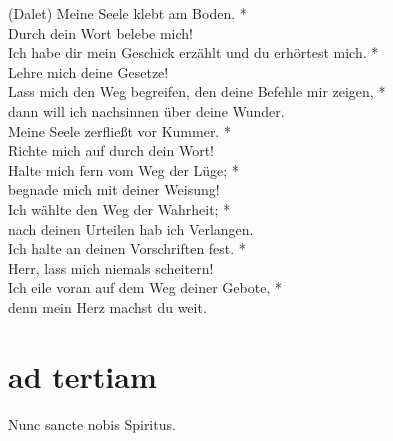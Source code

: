                           (Dalet)
Meine Seele klebt am Boden. *\\
Durch dein Wort belebe mich!\\ \vin 
Ich habe dir mein Geschick erzählt und du erhörtest mich. *\\ \vin
Lehre mich deine Gesetze!\\
Lass mich den Weg begreifen, den deine Befehle mir zeigen, *\\
dann will ich nachsinnen über deine Wunder.\\ \vin
Meine Seele zerfließt vor Kummer. *\\ \vin
Richte mich auf durch dein Wort!\\
Halte mich fern vom Weg der Lüge; *\\
begnade mich mit deiner Weisung!\\ \vin 
Ich wählte den Weg der Wahrheit; *\\ \vin
nach deinen Urteilen hab ich Verlangen.\\ 
 Ich halte an deinen Vorschriften fest. *\\
Herr, lass mich niemals scheitern!\\ \vin
Ich eile voran auf dem Weg deiner Gebote, *\\ \vin
denn mein Herz machst du weit.\\


















\section[horae minores]{ad tertiam}

 Nunc sancte nobis Spiritus.

\vspace{0.3cm}

\def\greinitialformat#1{{\fontsize{40}{40}\selectfont #1}}
\gresetfirstlineaboveinitial{\small \textcolor{red}{ xiv - xvi }}{}
\setaboveinitialseparation{0.72mm}



